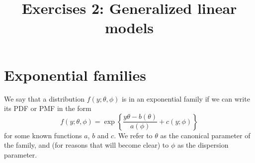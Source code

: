 \documentclass{mynotes}
\title[Lesson 1 $\cdot$ SDS 383D]{Exercises 2: Generalized linear models}
\date{}  %
\begin{document}
\maketitle%

\section{Exponential families}

We say that a distribution $f(y; \theta, \phi)$ is in an exponential family if we can write its PDF or PMF in the form
$$
f(y; \theta, \phi) = \exp \left\{ \frac{y \theta - b(\theta)}{a(\phi)} + c(y; \phi)   \right \}
$$
for some known functions $a$, $b$ and $c$.  We refer to $\theta$ as the canonical parameter of the family, and  (for reasons that will become clear) to $\phi$ as the dispersion parameter.  
\end{document}
